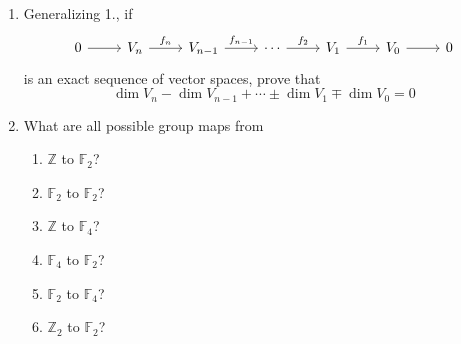 \begin{enumerate}
\item 
    Generalizing 1., if
    \[ \begin{tikzcd}
        0 \ar[r] & V_n \ar[r,"f_n"] & V_{n-1} \ar[r,"f_{n-1}"] & \cdots \ar[r,"f_2"] & V_1 \ar[r,"f_1"] & V_0 \ar[r] & 0
    \end{tikzcd}\]
    is an exact sequence of vector spaces, prove that 
    \[
    \dim V_n - \dim V_{n-1} + \cdots \pm \dim V_1 \mp \dim V_0 = 0
    \]

    \item What are all possible group maps from 
    \begin{enumerate}
        \item $\mathbb{Z}$ to $\mathbb{F}_2$?
        \item $\mathbb{F}_2$ to $\mathbb{F}_2$?
        \item $\mathbb{Z}$ to $\mathbb{F}_4$?
        \item $\mathbb{F}_4$ to $\mathbb{F}_2$?
        \item $\mathbb{F}_2$ to $\mathbb{F}_4$?
        \item $\mathbb{Z}_2$ to $\mathbb{F}_2$?
    \end{enumerate}

\end{enumerate}